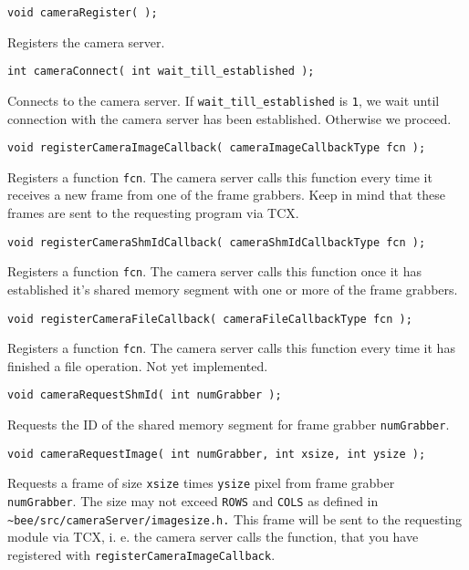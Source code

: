 \documentclass{article}
\begin{document}
\begin{description}
  
\item \texttt{void cameraRegister( );}

  Registers the camera server.
 
\item \texttt{int cameraConnect( int wait\_till\_established );} 
  
  Connects to the camera server. If \texttt{wait\_till\_established} is
  \texttt{1}, we wait until connection with the camera server has been
  established. Otherwise we proceed.
 
\item \texttt{void registerCameraImageCallback( cameraImageCallbackType fcn
    );} 
  
  Registers a function \texttt{fcn}. The camera server calls this function
  every time it receives a new frame from one of the frame grabbers. Keep in
  mind that these frames are sent to the requesting program via TCX.
 
\item \texttt{void registerCameraShmIdCallback( cameraShmIdCallbackType fcn
    );} 
  
  Registers a function \texttt{fcn}. The camera server calls this function
  once it has established it's shared memory segment with one or more of
  the frame grabbers.
 
\item \texttt{void registerCameraFileCallback( cameraFileCallbackType fcn );}
  
  Registers a function \texttt{fcn}. The camera server calls this function
  every time it has finished a file operation. Not yet implemented.
 
\item \texttt{void cameraRequestShmId( int numGrabber );} 
  
  Requests the ID of the shared memory segment for frame grabber
  \texttt{numGrabber}.
 
\item \texttt{void cameraRequestImage( int numGrabber, int xsize, int ysize
    );}
  
  Requests a frame of size \texttt{xsize} times \texttt{ysize} pixel from
  frame grabber \texttt{numGrabber}. The size may not exceed \texttt{ROWS} and
  \texttt{COLS} as defined in \texttt{\~{}bee/src/cameraServer/imagesize.h.}
  This frame will be sent to the requesting module via TCX, i. e. the camera
  server calls the function, that you have registered with
  \texttt{registerCameraImageCallback}.
 

\end{description}
\end{document}
